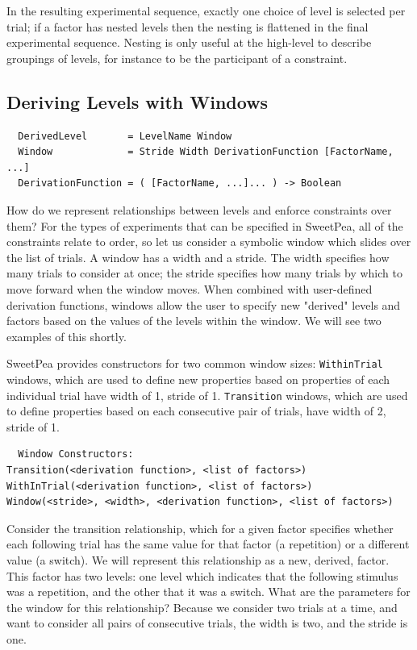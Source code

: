 In the resulting experimental sequence, exactly one choice of level is selected per trial; if a factor has nested levels then the nesting is flattened in the final experimental sequence. Nesting is only useful at the high-level to describe groupings of levels, for instance to be the participant of a constraint.



\subsection{Deriving Levels with Windows}

\begin{verbatim}
  DerivedLevel       = LevelName Window
  Window             = Stride Width DerivationFunction [FactorName, ...]
  DerivationFunction = ( [FactorName, ...]... ) -> Boolean
\end{verbatim}

How do we represent relationships between levels and enforce constraints over them? For the types of experiments that can be specified in SweetPea, all of the constraints relate to order, so let us consider a symbolic window which slides over the list of trials. A window has a width and a stride. The width specifies how many trials to consider at once; the stride specifies how many trials by which to move forward when the window moves. When combined with user-defined derivation functions, windows allow the user to specify new "derived" levels and factors based on the values of the levels within the window. We will see two examples of this shortly.

SweetPea provides constructors for two common window sizes: \texttt{WithinTrial} windows, which are used to define new properties based on properties of each individual trial have width of 1, stride of 1. \texttt{Transition} windows, which are used to define properties based on each consecutive pair of trials, have width of 2, stride of 1.

\begin{verbatim}
  Window Constructors:
Transition(<derivation function>, <list of factors>)
WithInTrial(<derivation function>, <list of factors>)
Window(<stride>, <width>, <derivation function>, <list of factors>)
\end{verbatim}

Consider the transition relationship, which for a given factor specifies whether each following trial has the same value for that factor (a repetition) or a different value (a switch). We will represent this relationship as a new, derived, factor. This factor has two levels: one level which indicates that the following stimulus was a repetition, and the other that it was a switch. What are the parameters for the window for this relationship? Because we consider two trials at a time, and want to consider all pairs of consecutive trials, the width is two, and the stride is one.

